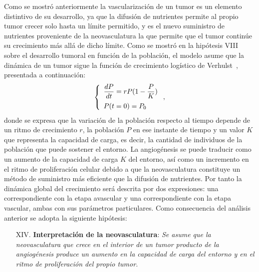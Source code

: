 Como se mostr\'o anteriormente la vascularizaci\'on de un tumor es un elemento distintivo de su desarrollo, ya que la difusi\'on de nutrientes permite al propio tumor crecer solo hasta un l\'imite permitido, y es el nuevo suministro de nutrientes proveniente de la neovasculatura la que permite que el tumor contin\'ue su crecimiento m\'as all\'a de dicho l\'imite. Como se mostr\'o en la hip\'otesis VIII sobre el desarrollo tumoral en funci\'on de la poblaci\'on, el modelo asume que la din\'amica de un tumor sigue la funci\'on de crecimiento log\'istico de Verhulst~\cite{verhulst}, presentada a continuaci\'on:
\begin{equation}
\left\lbrace
	\begin{array}{l}		
		\displaystyle\frac{dP}{dt} = rP(1-\displaystyle\frac{P}{K})\vspace*{0.2cm}\\
		P(t=0)=P_0
	\end{array}
\right., \label{eq-verhulst}
\end{equation}
donde se expresa que la variaci\'on de la poblaci\'on respecto al tiempo depende de un ritmo de crecimiento $r$, la poblaci\'on $P$ en ese instante de tiempo y un valor $K$ que representa la capacidad de carga, es decir, la cantidad de individuos de la poblaci\'on que puede sostener el entorno. La angiog\'enesis se puede traducir como un aumento de la capacidad de carga $K$ del entorno, as\'i como un incremento en el ritmo de proliferaci\'on celular debido a que la neovasculatura constituye un m\'etodo de suministro m\'as eficiente que la difusi\'on de nutrientes. Por tanto la din\'amica global del crecimiento ser\'a descrita por dos expresiones: una correspondiente con la etapa avascular y una correspondiente con la etapa vascular, ambas con sus par\'ametros particulares. Como consecuencia del an\'alisis anterior se adopta la siguiente hip\'otesis:

\begin{itemize}
\item [{XIV.}] \textbf{Interpretaci\'on de la neovasculatura}: \emph{Se asume que la neovasculatura que crece en el interior de un tumor producto de la angiog\'enesis produce un aumento en la capacidad de carga del entorno y en el ritmo de proliferaci\'on del propio tumor.} \label{XIV}
\end{itemize} 


